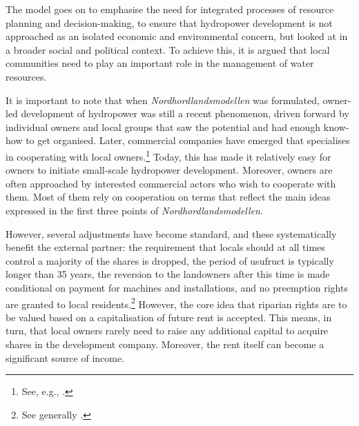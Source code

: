 The model goes on to emphasise the need for integrated processes of resource planning and decision-making, to ensure that hydropower development is not approached as an isolated economic and environmental concern, but looked at in a broader social and political context. To achieve this, it is argued that local communities need to play an important role in the management of water resources.  

It is important to note that when {\it Nordhordlandsmodellen} was formulated, owner-led development of hydropower was still a recent phenomenon, driven forward by individual owners and local groups that saw the potential and had enough know-how to get organised. Later, commercial companies have emerged that specialises in cooperating with local owners.\footnote{See, e.g., \cite{larsen06}.} Today, this has made it relatively easy for owners to initiate small-scale hydropower development. Moreover, owners are often approached by interested commercial actors who wish to cooperate with them. Most of them rely on cooperation on terms that reflect the main ideas expressed in the first three points of {\it Nordhordlandsmodellen}.

However, several adjustments have become standard, and these systematically benefit the external partner: the requirement that locals should at all times control a majority of the shares is dropped, the period of usufruct is typically longer than 35 years, the reversion to the landowners after this time is made conditional on payment for machines and installations, and no preemption rights are granted to local residents.\footnote{See generally \cite{hauge15}.} However, the core idea that riparian rights are to be valued based on a capitalisation of future rent is accepted. This means, in turn, that local owners rarely need to raise any additional capital to acquire shares in the development company. Moreover, the rent itself can become a significant source of income.

